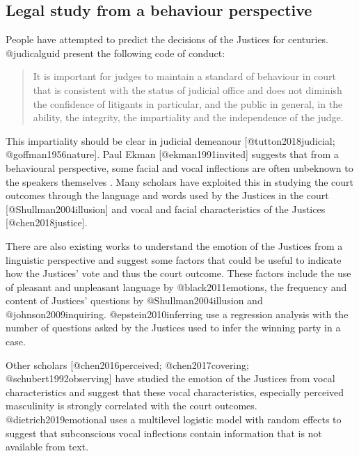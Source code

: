 \documentclass{monashthesis}
\begin{document}
\hypertarget{legal-study-from-a-behaviour-perspective}{%
\subsection{Legal study from a behaviour perspective}\label{legal-study-from-a-behaviour-perspective}}

People have attempted to predict the decisions of the Justices for centuries. @judicalguid present the following code of conduct:

\begin{quote}
It is important for judges to maintain a standard of behaviour in court that is consistent with the status of judicial office and does not diminish the confidence of litigants in particular, and the public in general, in the ability, the integrity, the impartiality and the independence of the judge.
\end{quote}

This impartiality should be clear in judicial demeanour {[}@tutton2018judicial; @goffman1956nature{]}. Paul Ekman {[}@ekman1991invited{]} suggests that from a behavioural perspective, some facial and vocal inflections are often unbeknown to the speakers themselves . Many scholars have exploited this in studying the court outcomes through the language and words used by the Justices in the court {[}@Shullman2004illusion{]} and vocal and facial characteristics of the Justices {[}@chen2018justice{]}.

There are also existing works to understand the emotion of the Justices from a linguistic perspective and suggest some factors that could be useful to indicate how the Justices' vote and thus the court outcome. These factors include the use of pleasant and unpleasant language by @black2011emotions, the frequency and content of Justices' questions by @Shullman2004illusion and @johnson2009inquiring. @epstein2010inferring use a regression analysis with the number of questions asked by the Justices used to infer the winning party in a case.

Other scholars {[}@chen2016perceived; @chen2017covering; @schubert1992observing{]} have studied the emotion of the Justices from vocal characteristics and suggest that these vocal characteristics, especially perceived masculinity is strongly correlated with the court outcomes. @dietrich2019emotional uses a multilevel logistic model with random effects to suggest that subconscious vocal inflections contain information that is not available from text.
\end{document}

